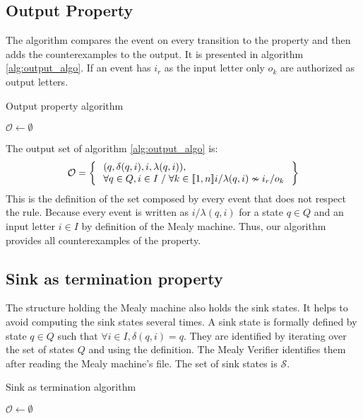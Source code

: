 \subsection{Output Property}
The algorithm compares the event on every transition to the property and then adds the counterexamples to the output.
It is presented in algorithm \ref*{alg:output_algo}.
If an event has $i_r$ as the input letter only $o_k$ are authorized as output letters.
\begin{algorithm}
    \caption{Output property algorithm}\label{alg:output_algo}
    $\mathcal{O}\gets \emptyset$\;
\end{algorithm}

The output set  of algorithm \ref*{alg:output_algo} is:
\begin{equation}
    \centering
    \begin{aligned}
         \mathcal{O}&=\Set{\begin{array}{l}
            (q,\delta(q,i) ,i ,\lambda(q,i)), \\
            \forall q \in Q, i\in I \; / \;\forall k \in [\![1,n]\!] i/\lambda(q,i) \nsim i_r/o_k
          \end{array}}\\
    \end{aligned}
    \nonumber
\end{equation}
This is the definition of the set composed by every event that does not respect the rule.
Because every event is written as $i/\lambda(q,i)$ for a state $q\in Q$ and an input letter $i\in I$ by definition of the Mealy machine.
Thus, our algorithm provides all counterexamples of the property.


\subsection{Sink as termination property}
The structure holding the Mealy machine also holds the sink states.
It helps to avoid computing the sink states several times. 
A sink state is formally defined by state $q\in Q$ such that $\forall i\in I, \delta(q,i)=q$. 
They are identified by iterating over the set of states $Q$ and using the definition.
The Mealy Verifier identifies them after reading the Mealy machine's file.
The set of sink states is $\mathcal{S}$.
\begin{algorithm}
    \caption{Sink as termination algorithm}\label{alg:sink_desc}
    $\mathcal{O}\gets \emptyset$\;
\end{algorithm}

